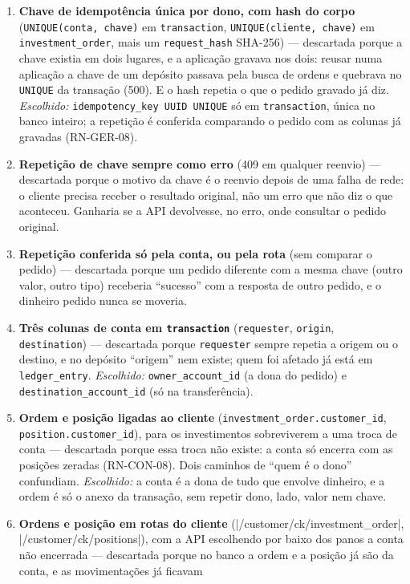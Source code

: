 \documentclass[11pt,a4paper]{article}
\newcommand{\tb}[1]{\texttt{#1}}           %
\begin{document}
\begin{enumerate}
  \item \textbf{Chave de idempotência única por dono, com hash do corpo} (\tb{UNIQUE(conta, chave)}
  em \tb{transaction}, \tb{UNIQUE(cliente, chave)} em \tb{investment_order}, mais um
  \tb{request_hash} SHA-256) --- descartada porque a chave existia em dois lugares, e a aplicação
  gravava nos dois: reusar numa aplicação a chave de um depósito passava pela busca de ordens e
  quebrava no \tb{UNIQUE} da transação (500). E o hash repetia o que o pedido gravado já diz.
  \emph{Escolhido:} \tb{idempotency_key UUID UNIQUE} só em \tb{transaction}, única no banco
  inteiro; a repetição é conferida comparando o pedido com as colunas já gravadas (RN-GER-08).
  \item \textbf{Repetição de chave sempre como erro} (409 em qualquer reenvio) --- descartada porque
  o motivo da chave é o reenvio depois de uma falha de rede: o cliente precisa receber o resultado
  original, não um erro que não diz o que aconteceu. Ganharia se a API devolvesse, no erro, onde
  consultar o pedido original.
  \item \textbf{Repetição conferida só pela conta, ou pela rota} (sem comparar o pedido) ---
  descartada porque um pedido diferente com a mesma chave (outro valor, outro tipo) receberia
  ``sucesso'' com a resposta de outro pedido, e o dinheiro pedido nunca se moveria.
  \item \textbf{Três colunas de conta em \tb{transaction}} (\tb{requester}, \tb{origin},
  \tb{destination}) --- descartada porque \tb{requester} sempre repetia a origem ou o destino, e no
  depósito ``origem'' nem existe; quem foi afetado já está em \tb{ledger_entry}.
  \emph{Escolhido:} \tb{owner_account_id} (a dona do pedido) e \tb{destination_account_id} (só na
  transferência).
  \item \textbf{Ordem e posição ligadas ao cliente} (\tb{investment_order.customer_id},
  \tb{position.customer_id}), para os investimentos sobreviverem a uma troca de conta ---
  descartada porque essa troca não existe: a conta só encerra com as posições zeradas
  (RN-CON-08). Dois caminhos de ``quem é o dono'' confundiam. \emph{Escolhido:} a conta é a dona de
  tudo que envolve dinheiro, e a ordem é só o anexo da transação, sem repetir dono, lado, valor
  nem chave.
  \item \textbf{Ordens e posição em rotas do cliente} (\rota|/customer/{ck}/investment_order|,
  \rota|/customer/{ck}/positions|), com a API escolhendo por baixo dos panos a conta não encerrada
  --- descartada porque no banco a ordem e a posição já são da conta, e as movimentações já ficavam

\end{enumerate}
\end{document}
